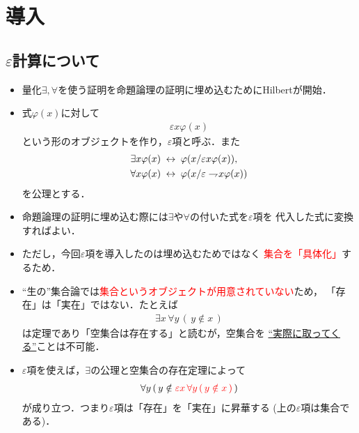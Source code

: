 \section{導入}
\subsection{$\varepsilon$計算について}
	\begin{itemize}
	\setlength{\itemsep}{10pt}
		\item 量化$\exists,\forall$を使う証明を命題論理の証明に埋め込むためにHilbertが開始．
		
		\item 式$\varphi(x)$に対して
			\begin{align}
				\varepsilon x \varphi(x)
			\end{align}
			という形のオブジェクトを作り，$\varepsilon$項と呼ぶ．また
			\begin{align}
				\exists x \varphi(x) &\hspace{0.25em}\leftrightarrow\hspace{0.25em} \varphi(x/\varepsilon x \varphi(x)), \\
				\forall x \varphi(x) &\hspace{0.25em}\leftrightarrow\hspace{0.25em} \varphi(x/\varepsilon \rightharpoondown\hspace{-0.25em} x \varphi(x))
			\end{align}
			を公理とする．
			
		\item 命題論理の証明に埋め込む際には$\exists$や$\forall$の付いた式を$\varepsilon$項を
			代入した式に変換すればよい．
			
		\item ただし，今回$\varepsilon$項を導入したのは埋め込むためではなく
			\textcolor{red}{集合を「具体化」}するため．
	\end{itemize}
	
\newpage
	\begin{itemize}
	\setlength{\itemsep}{10pt}
		\item ``生の''集合論では\textcolor{red}{集合というオブジェクトが用意されていない}ため，
			「存在」は「実在」ではない．たとえば
			\begin{align}
				\exists x\, \forall y\, (\, y \notin x\, )
			\end{align}
			は定理であり「空集合は存在する」と読むが，空集合を
			\underline{``実際に取ってくる''}ことは不可能．
			
		\item $\varepsilon$項を使えば，$\exists$の公理と空集合の存在定理によって
			\begin{align}
				\forall y\, (\, y \notin \color{red}{\varepsilon x\, \forall y\, (\, y \notin x\, )}\, \color{black}{)}
			\end{align}
			が成り立つ．つまり$\varepsilon$項は「存在」を「実在」に昇華する
			(上の$\varepsilon$項は集合である)．
	\end{itemize}
	
